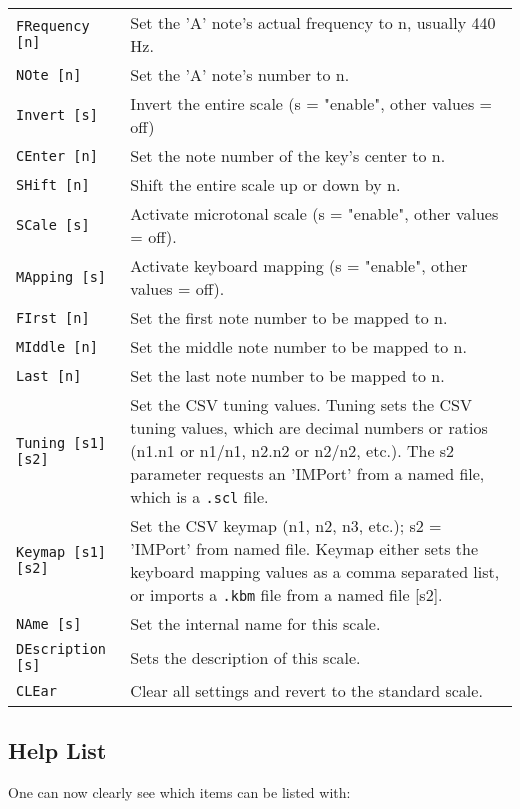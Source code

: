 \begin{center}
\begin{longtable}{p{4cm} p{10cm}}
\texttt{FRequency [n]} &
   Set the 'A' note's actual frequency to n, usually 440 Hz. \\
\texttt{NOte [n]} &
   Set the 'A' note's number to n. \\
\texttt{Invert [s]} &
   Invert the entire scale (s = "enable", other values = off) \\
\texttt{CEnter [n]} &
   Set the note number of the key's center to n. \\
\texttt{SHift [n]} &
   Shift the entire scale up or down by n. \\
\texttt{SCale [s]} &
   Activate microtonal scale (s = "enable", other values = off). \\
\texttt{MApping [s]} &
   Activate keyboard mapping (s = "enable", other values = off). \\
\texttt{FIrst [n]} &
   Set the first note number to be mapped to n. \\
\texttt{MIddle [n]} &
   Set the middle note number to be mapped to n. \\
\texttt{Last [n]} &
   Set the last note number to be mapped to n. \\
\texttt{Tuning [s1] [s2]} &
   Set the CSV tuning values.
   Tuning sets the CSV tuning values, which are decimal numbers or ratios
   (n1.n1 or n1/n1, n2.n2 or n2/n2, etc.).
   The s2 parameter requests an 'IMPort' from a named file, which is
   \index{.scl}
   \index{config!.scl}
   a \texttt{.scl} file. \\
\texttt{Keymap [s1] [s2]} &
   Set the CSV keymap (n1, n2, n3, etc.); s2 = 'IMPort' from named file.
   Keymap either sets the keyboard mapping values as a comma separated list, or
   imports a
   \index{.kbm}
   \index{config!.kbm}
   \texttt{.kbm} file from a named file [s2]. \\
\texttt{NAme [s]} &
   Set the internal name for this scale. \\
\texttt{DEscription [s]} &
   Sets the description of this scale. \\
\texttt{CLEar} &
   Clear all settings and revert to the standard scale. \\
\end{longtable}
\end{center}


\subsection{Help List}
\label{subsec:command_line_help_list}

   One can now clearly see which items can be listed with:

